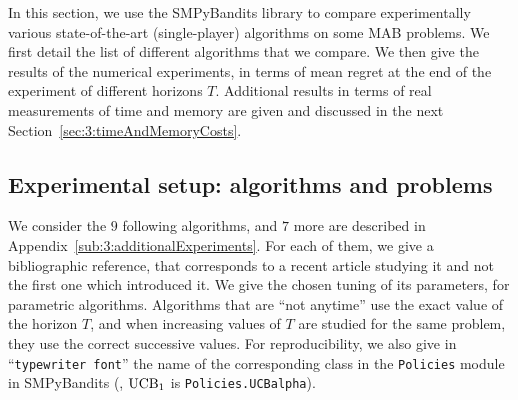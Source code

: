 
In this section, we use the SMPyBandits library to compare experimentally various state-of-the-art (single-player) algorithms on some MAB problems.
We first detail the list of different algorithms that we compare.
We then give the results of the numerical experiments, in terms of mean regret at the end of the experiment of different horizons $T$.
Additional results in terms of real measurements of time and memory are given and discussed in the next Section~\ref{sec:3:timeAndMemoryCosts}.


\subsection{Experimental setup: algorithms and problems}


We consider the $9$ following algorithms, and $7$ more are described in Appendix~\ref{sub:3:additionalExperiments}.
For each of them, we give a bibliographic reference, that corresponds to a recent article studying it and not the first one which introduced it.
We give the chosen tuning of its parameters, for parametric algorithms.
Algorithms that are ``not anytime'' use the exact value of the horizon $T$, and when increasing values of $T$ are studied for the same problem, they use the correct successive values.
%
For reproducibility, we also give in ``\texttt{typewriter font}'' the name of the corresponding class in the \texttt{Policies} module in SMPyBandits
(\eg, $\mathrm{UCB}_1$ is \texttt{Policies.UCBalpha}).

